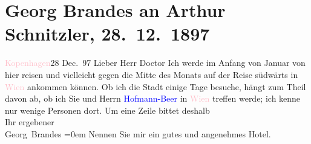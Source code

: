 

               \section[Georg Brandes an Arthur Schnitzler, 28. 12. 1897]{ Georg Brandes an Arthur Schnitzler, 28. 12. 1897}\nopagebreak{}\rehead{ }\normalsize\beginnumbering{} \toendnotes[C]{\smallbreak\pagebreak[2]} 
\pstart
           \raggedleft{}{\pb}\textcolor{pink}{Kopenhagen}{}\ledrightnote{\textcolor{pink}{Kopenhagen}}{\\}28 Dec. 97\pend
           \pstart\center{}Lieber Herr Doctor\pend\pstart
           Ich werde im Anfang von Januar von hier reisen und vielleicht gegen die Mitte des
                    Monats \introOben{}auf der Reise südwärts\introOben{} in \textcolor{pink}{Wien}{}\ledrightnote{\textcolor{pink}{Wien}} ankommen können. Ob ich die Stadt einige Tage besuche,
                    hängt zum Theil davon ab, ob ich Sie und Herrn \textcolor{blue}{Hofmann-Beer}{}\ledrightnote{\textcolor{blue}{Richard Beer-Hofmann}} in \textcolor{pink}{Wien}{}\ledrightnote{\textcolor{pink}{Wien}} treffen
                    werde; ich kenne nur wenige Personen dort.\pend
           \pstart
           Um
                    eine Zeile bittet deshalb{\\[\baselineskip]}Ihr ergebener{\\[\baselineskip]}\spacefill\mbox{Georg Brandes}\pend
           \leftskip=0em{}\pstart
           \noindent{}Nennen Sie mir ein gutes und angenehmes Hotel.\pend
           \endnumbering{}  
      